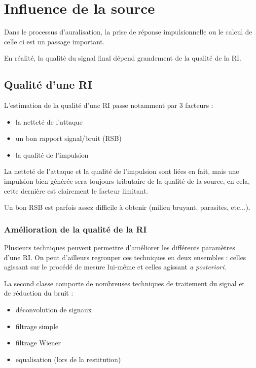 \chapter{Influence de la source}

Dans le processus d'auralisation, la prise de réponse impulsionnelle ou le calcul de celle ci est un passage important.

En réalité, la qualité du signal final dépend grandement de la qualité de la RI.

\section{Qualité d'une RI} %

L'estimation de la qualité d'une RI passe notamment par 3 facteurs :

\begin{itemize}
	\item la netteté de l'attaque
	\item un bon rapport signal/bruit (RSB)
	\item la qualité de l'impulsion
\end{itemize}

La netteté de l'attaque et la qualité de l'impulsion sont liées en fait, mais une impulsion bien générée sera toujours
tributaire de la qualité de la source, en cela, cette dernière est clairement le facteur limitant.

Un bon RSB est parfois assez difficile à obtenir (milieu bruyant, parasites, etc...).

\subsection{Amélioration de la qualité de la RI} %

Plusieurs techniques peuvent permettre d'améliorer les différents paramètres d'une RI. On peut d'ailleurs regrouper ces
techniques en deux ensembles : celles agissant sur le procédé de mesure lui-même et celles agissant \textit{a
posteriori}. 

La second classe comporte de nombreuses techniques de traitement du signal et de réduction du bruit :

\begin{itemize}
    \item déconvolution de signaux
    \item filtrage simple
    \item filtrage Wiener
    \item equalisation (lors de la restitution)
\end{itemize}

